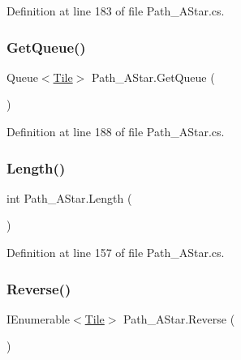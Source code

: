 Definition at line 183 of file Path\+\_\+\+A\+Star.\+cs.

\mbox{\label{class_path___a_star_ab0a0df483c3ebd910b7d7dccc9b94419}} 
\subsubsection{\texorpdfstring{Get\+Queue()}{GetQueue()}}
{\footnotesize\ttfamily Queue$<$\hyperlink{class_tile}{Tile}$>$ Path\+\_\+\+A\+Star.\+Get\+Queue (\begin{DoxyParamCaption}{ }\end{DoxyParamCaption})}



Definition at line 188 of file Path\+\_\+\+A\+Star.\+cs.

\mbox{\label{class_path___a_star_ac1f61fdada2f5a23c3cc748c3f1f143a}} 
\subsubsection{\texorpdfstring{Length()}{Length()}}
{\footnotesize\ttfamily int Path\+\_\+\+A\+Star.\+Length (\begin{DoxyParamCaption}{ }\end{DoxyParamCaption})}



Definition at line 157 of file Path\+\_\+\+A\+Star.\+cs.

\mbox{\label{class_path___a_star_ae3c8bf37c3a3e5adc0dc1b37d7fb8dc0}} 
\subsubsection{\texorpdfstring{Reverse()}{Reverse()}}
{\footnotesize\ttfamily I\+Enumerable$<$\hyperlink{class_tile}{Tile}$>$ Path\+\_\+\+A\+Star.\+Reverse (\begin{DoxyParamCaption}{ }\end{DoxyParamCaption})}



